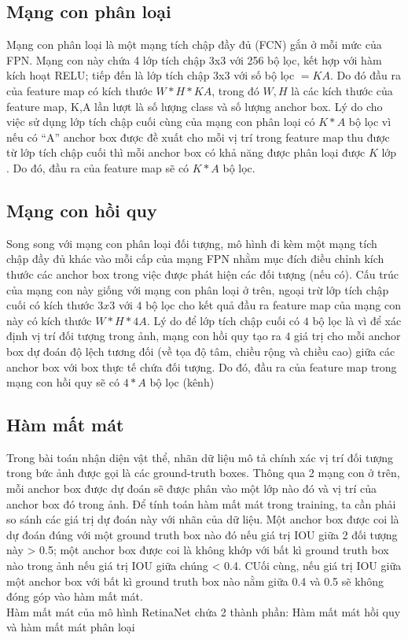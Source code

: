 \documentclass[a4paper, 12pt]{report}
\begin{document}
\subsection{Mạng con phân loại}
Mạng con phân loại là một mạng tích chập đầy đủ (FCN) gắn ở mỗi mức của FPN. Mạng con này chứa 4 lớp tích chập 3x3 với 256 bộ lọc, kết hợp với hàm kích hoạt RELU; tiếp đến là lớp tích chập 3x3 với số bộ lọc $= KA$. Do đó đầu ra của feature map có kích thước $W*H*KA$, trong đó $W,H$ là các kích thước của feature map, K,A lần lượt là số lượng class và số lượng anchor box. Lý do cho việc sử dụng lớp tích chập cuối cùng của mạng con phân loại có $K*A$  bộ lọc vì nếu có “A” anchor box được đề xuất cho mỗi vị trí trong feature map thu được từ lớp tích chập cuối thì mỗi anchor box  có khả năng được phân loại được $K$ lớp .  Do đó, đầu ra của feature map sẽ có $K*A$ bộ lọc.

\subsection{Mạng con hồi quy}
Song song với mạng con phân loại đối tượng, mô hình đi kèm một mạng tích chập đầy đủ khác vào mỗi cấp của mạng FPN nhằm mục đích điều chỉnh kích thước các anchor box trong việc  được phát hiện các đối tượng (nếu có).  Cấu trúc của mạng con này giống với mạng con phân loại ở trên, ngoại trừ lớp tích chập cuối có kích thước $3x3$ với $4$ bộ lọc cho kết quả đầu ra feature map của mạng con này có kích thước $W*H*4A$.  Lý do để lớp tích chập cuối có $4$ bộ lọc là vì để xác định vị trí đối tượng trong ảnh, mạng con hồi quy tạo ra $4$ giá trị cho mỗi anchor box  dự đoán độ lệch tương đối (về tọa độ tâm, chiều rộng và chiều cao) giữa các anchor box với  box thực tế chứa đối tượng. Do đó, đầu ra của feature map  trong mạng con hồi quy sẽ có $4*A$ bộ lọc (kênh)


\subsection{Hàm mất mát}
\hspace*{1cm}Trong bài toán nhận diện vật thể, nhãn dữ liệu mô tả chính xác vị trí đối tượng trong bức ảnh được gọi là các ground-truth boxes. Thông qua 2 mạng con ở trên, mỗi anchor box được dự đoán sẽ được phân vào một lớp nào đó và vị trí của anchor box đó trong ảnh. Để tính toán hàm mất mát trong training, ta cần phải so sánh các giá trị dự đoán này với nhãn của dữ liệu.  Một anchor box được coi là dự đoán đúng với một ground truth box nào đó nếu giá trị IOU giữa 2 đối tượng này > 0.5; một anchor box được coi là không khớp với bất kì ground truth box nào trong ảnh nếu giá trị IOU giữa chúng < 0.4.  CUối cùng, nếu giá trị IOU giữa một anchor box với bất kì ground truth box nào nằm giữa 0.4 và 0.5 sẽ không đóng góp vào hàm mất mát. \\
\hspace*{1cm}
Hàm mất mát của mô hình RetinaNet chứa 2 thành phần: Hàm mất mát hồi quy và hàm mất mát phân loại
\end{document}
